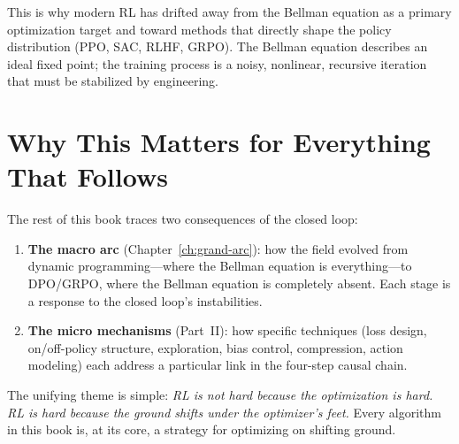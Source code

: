 This is why modern RL has drifted away from the Bellman equation as a primary optimization target and toward methods that directly shape the policy distribution (PPO, SAC, RLHF, GRPO).
The Bellman equation describes an ideal fixed point; the training process is a noisy, nonlinear, recursive iteration that must be stabilized by engineering.

\section{Why This Matters for Everything That Follows}

The rest of this book traces two consequences of the closed loop:

\begin{enumerate}
    \item \textbf{The macro arc} (Chapter~\ref{ch:grand-arc}): how the field evolved from dynamic programming---where the Bellman equation is everything---to DPO/GRPO, where the Bellman equation is completely absent.
          Each stage is a response to the closed loop's instabilities.
    \item \textbf{The micro mechanisms} (Part~II): how specific techniques (loss design, on/off-policy structure, exploration, bias control, compression, action modeling) each address a particular link in the four-step causal chain.
\end{enumerate}

The unifying theme is simple:
\emph{RL is not hard because the optimization is hard.
RL is hard because the ground shifts under the optimizer's feet.}
Every algorithm in this book is, at its core, a strategy for optimizing on shifting ground.
